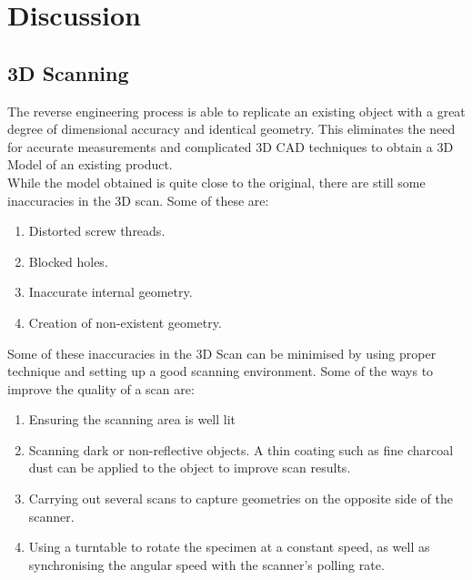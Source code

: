 \chapter{Discussion}
\section{3D Scanning}
The reverse engineering process is able to replicate an existing object with a great degree of dimensional accuracy and identical geometry. This eliminates the need for accurate measurements and complicated 3D CAD techniques to obtain a 3D Model of an existing product.\\
While the model obtained is quite close to the original, there are still some inaccuracies in the 3D scan. Some of these are:
\begin{enumerate}
	\item Distorted screw threads.
	\item Blocked holes.
	\item Inaccurate internal geometry.
	\item Creation of non-existent geometry.
\end{enumerate}
Some of these inaccuracies in the 3D Scan can be minimised by using proper technique and setting up a good scanning environment. Some of the ways to improve the quality of a scan are:
\begin{enumerate}
	\item Ensuring the scanning area is well lit
	\item Scanning dark or non-reflective objects. A thin coating such as fine charcoal dust can be applied to the object to improve scan results.
	\item Carrying out several scans to capture geometries on the opposite side of the scanner.
	\item Using a turntable to rotate the specimen at a constant speed, as well as synchronising the angular speed with the scanner's polling rate.
\end{enumerate}